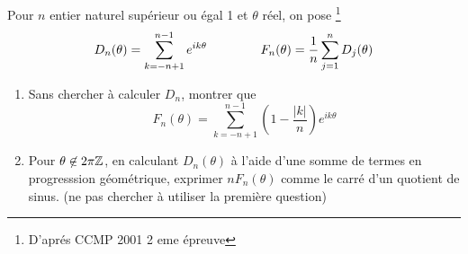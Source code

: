 Pour $n$ entier naturel sup{\'e}rieur ou {\'e}gal 1 et $\theta$ r{\'e}el, on
pose \footnote{D'apr{\'e}s CCMP 2001 2 eme {\'e}preuve}
\begin{displaymath}
  D_n(\theta)=\sum_{k=-n+1}^{n-1}e^{ik\theta} \hspace{1.5cm}
  F_n(\theta)=\frac{1}{n}\sum_{j=1}^n D_j(\theta) 
\end{displaymath}
\begin{enumerate}
  \item Sans chercher à calculer $D_n$, montrer que
\begin{displaymath}
F_n(\theta)=\sum_{k=-n+1}^{n-1}(1-\frac{|k|}{n})e^{ik\theta}  
\end{displaymath}
  \item Pour $\theta \not \in 2\pi\mathbb{Z}$, en calculant $D_n(\theta)$ à l'aide d'une somme de termes en progresssion géométrique, exprimer $nF_n(\theta)$ comme le carr{\'e} d'un quotient de sinus. (ne pas chercher à utiliser la première question)
\end{enumerate}
